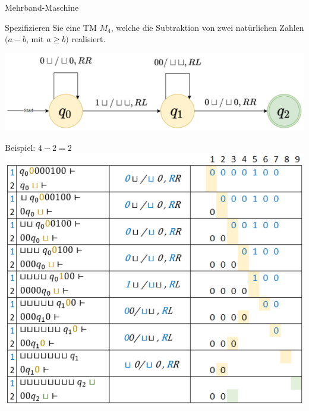 \begin{example2}{Mehrband-Maschine}\\
    \begin{minipage}{0.4\linewidth}
    Spezifizieren Sie eine TM $M_{4}$, welche die Subtraktion von zwei natürlichen Zahlen $(a-b$, mit $a \geq b)$ realisiert.
    \end{minipage}
    \begin{minipage}{0.6\linewidth}
        \includegraphics[width=1\linewidth]{mehrband_maschine1.png}
    \end{minipage}
    
    Beispiel: $4-2=2$\\
    \includegraphics[width=0.7\linewidth]{mehrband_maschine2.png}
\end{example2}


